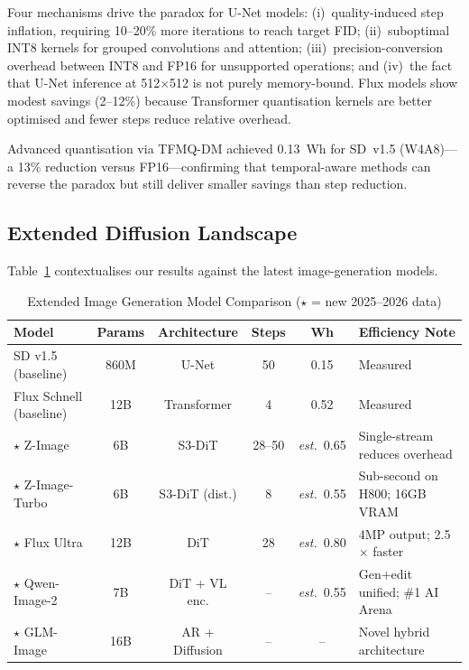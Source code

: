 \documentclass[AMS,STIX2COL]{WileyNJD-v2}
\begin{document}
Four mechanisms drive the paradox for U-Net models: (i)~quality-induced step inflation, requiring 10--20\% more iterations to reach target FID; (ii)~suboptimal INT8 kernels for grouped convolutions and attention; (iii)~precision-conversion overhead between INT8 and FP16 for unsupported operations; and (iv)~the fact that U-Net inference at 512$\times$512 is not purely memory-bound. Flux models show modest savings (2--12\%) because Transformer quantisation kernels are better optimised and fewer steps reduce relative overhead.

Advanced quantisation via TFMQ-DM achieved 0.13~Wh for SD~v1.5 (W4A8)---a 13\% reduction versus FP16---confirming that temporal-aware methods can reverse the paradox but still deliver smaller savings than step reduction.

\subsection{Extended Diffusion Landscape}

Table~\ref{tab:diff_extended} contextualises our results against the latest image-generation models.

\begin{table}[t]
\caption{Extended Image Generation Model Comparison ($\star$ = new 2025--2026 data)}\label{tab:diff_extended}
\centering
\begin{tabular}{lccccl}
\toprule
\textbf{Model} & \textbf{Params} & \textbf{Architecture} & \textbf{Steps} & \textbf{Wh} & \textbf{Efficiency Note} \\
\midrule
SD v1.5 (baseline)     & 860M  & U-Net           & 50       & 0.15       & Measured \\
Flux Schnell (baseline)& 12B   & Transformer     & 4        & 0.52       & Measured \\
$\star$ Z-Image        & 6B    & S3-DiT          & 28--50   & \textit{est.}~0.65 & Single-stream reduces overhead \\
$\star$ Z-Image-Turbo  & 6B    & S3-DiT (dist.)  & 8        & \textit{est.}~0.55 & Sub-second on H800; 16GB VRAM \\
$\star$ Flux Ultra     & 12B   & DiT             & 28       & \textit{est.}~0.80 & 4MP output; 2.5$\times$ faster \\
$\star$ Qwen-Image-2   & 7B    & DiT + VL enc.   & --       & \textit{est.}~0.55 & Gen+edit unified; \#1 AI Arena \\
$\star$ GLM-Image      & 16B   & AR + Diffusion  & --       & --         & Novel hybrid architecture \\
\bottomrule
\end{tabular}
\end{table}
\end{document}
